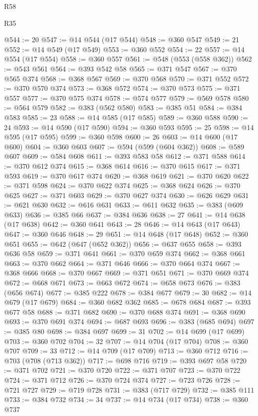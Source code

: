 \begin{lexlean}{R58}
\begin{lexlean}{R35}
\begin{coremodule}
{{{{{{{{{{{{{{{{{{{{{{{{{{{{{{{{{{{{{{{{{{{{{{{{{{{{@544 := 20
@547 := @14 @544 (@17 @544)
@548 := @360 @547
@549 := 21
@552 := @14 @549 (@17 @549)
@553 := @360 @552
@554 := 22
@557 := @14 @554 (@17 @554)
@558 := @360 @557
@561 := @548 (@553 (@558 @362))
@562 := @543 @561
@564 := @393 @542 @58
@565 := @371 @547
@567 := @370 @565 @374
@568 := @368 @567
@569 := @370 @568
@570 := @371 @552
@572 := @370 @570 @374
@573 := @368 @572
@574 := @370 @573
@575 := @371 @557
@577 := @370 @575 @374
@578 := @574 @577
@579 := @569 @578
@580 := @564 @579
@582 := @383 (@562 @580)
@583 := @385 @51
@584 := @384 @583
@585 := 23
@588 := @14 @585 (@17 @585)
@589 := @360 @588
@590 := 24
@593 := @14 @590 (@17 @590)
@594 := @360 @593
@595 := 25
@598 := @14 @595 (@17 @595)
@599 := @360 @598
@600 := 26
@603 := @14 @600 (@17 @600)
@604 := @360 @603
@607 := @594 (@599 (@604 @362))
@608 := @589 @607
@609 := @584 @608
@611 := @393 @583 @58
@612 := @371 @588
@614 := @370 @612 @374
@615 := @368 @614
@616 := @370 @615
@617 := @371 @593
@619 := @370 @617 @374
@620 := @368 @619
@621 := @370 @620
@622 := @371 @598
@624 := @370 @622 @374
@625 := @368 @624
@626 := @370 @625
@627 := @371 @603
@629 := @370 @627 @374
@630 := @626 @629
@631 := @621 @630
@632 := @616 @631
@633 := @611 @632
@635 := @383 (@609 @633)
@636 := @385 @66
@637 := @384 @636
@638 := 27
@641 := @14 @638 (@17 @638)
@642 := @360 @641
@643 := 28
@646 := @14 @643 (@17 @643)
@647 := @360 @646
@648 := 29
@651 := @14 @648 (@17 @648)
@652 := @360 @651
@655 := @642 (@647 (@652 @362))
@656 := @637 @655
@658 := @393 @636 @58
@659 := @371 @641
@661 := @370 @659 @374
@662 := @368 @661
@663 := @370 @662
@664 := @371 @646
@666 := @370 @664 @374
@667 := @368 @666
@668 := @370 @667
@669 := @371 @651
@671 := @370 @669 @374
@672 := @668 @671
@673 := @663 @672
@674 := @658 @673
@676 := @383 (@656 @674)
@677 := @385 @222
@678 := @384 @677
@679 := 30
@682 := @14 @679 (@17 @679)
@684 := @360 @682 @362
@685 := @678 @684
@687 := @393 @677 @58
@688 := @371 @682
@690 := @370 @688 @374
@691 := @368 @690
@693 := @370 @691 @374
@694 := @687 @693
@696 := @383 (@685 @694)
@697 := @385 @80
@698 := @384 @697
@699 := 31
@702 := @14 @699 (@17 @699)
@703 := @360 @702
@704 := 32
@707 := @14 @704 (@17 @704)
@708 := @360 @707
@709 := 33
@712 := @14 @709 (@17 @709)
@713 := @360 @712
@716 := @703 (@708 (@713 @362))
@717 := @698 @716
@719 := @393 @697 @58
@720 := @371 @702
@721 := @370 @720
@722 := @371 @707
@723 := @370 @722
@724 := @371 @712
@726 := @370 @724 @374
@727 := @723 @726
@728 := @721 @727
@729 := @719 @728
@731 := @383 (@717 @729)
@732 := @385 @111
@733 := @384 @732
@734 := 34
@737 := @14 @734 (@17 @734)
@738 := @360 @737
}}}}}}}}}}}}}}}}}}}}}}}}}}}}}}}}}}}}}}}}}}}}}}}}}}}}
\end{coremodule}
\end{lexlean}
\end{lexlean}
